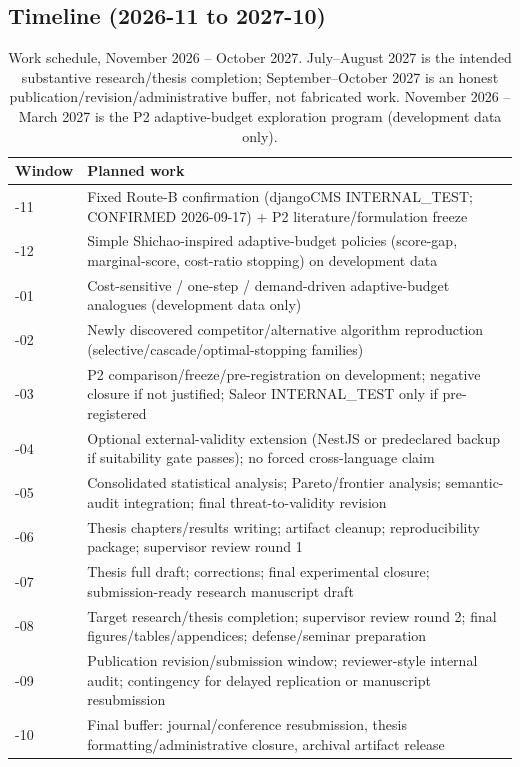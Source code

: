 \documentclass[11pt,a4paper]{article}
\begin{document}
\subsection{Timeline (2026-11 to 2027-10)}
\begin{table}[h]
\centering
\small
\renewcommand{\arraystretch}{1.25}
\setlength{\tabcolsep}{6pt}
\begin{tabularx}{\textwidth}{@{}>{\raggedright\arraybackslash}p{1.9cm}>{\raggedright\arraybackslash}X@{}}
\toprule
\textbf{Window} & \textbf{Planned work} \\
\midrule
2026-11 & Fixed Route-B confirmation (djangoCMS INTERNAL\_TEST; CONFIRMED 2026-09-17) + P2 literature/formulation freeze \\
2026-12 & Simple Shichao-inspired adaptive-budget policies (score-gap, marginal-score, cost-ratio stopping) on development data \\
2027-01 & Cost-sensitive / one-step / demand-driven adaptive-budget analogues (development data only) \\
2027-02 & Newly discovered competitor/alternative algorithm reproduction (selective/cascade/optimal-stopping families) \\
2027-03 & P2 comparison/freeze/pre-registration on development; negative closure if not justified; Saleor INTERNAL\_TEST only if pre-registered \\
2027-04 & Optional external-validity extension (NestJS or predeclared backup if suitability gate passes); no forced cross-language claim \\
2027-05 & Consolidated statistical analysis; Pareto/frontier analysis; semantic-audit integration; final threat-to-validity revision \\
2027-06 & Thesis chapters/results writing; artifact cleanup; reproducibility package; supervisor review round 1 \\
2027-07 & Thesis full draft; corrections; final experimental closure; submission-ready research manuscript draft \\
2027-08 & Target research/thesis completion; supervisor review round 2; final figures/tables/appendices; defense/seminar preparation \\
2027-09 & Publication revision/submission window; reviewer-style internal audit; contingency for delayed replication or manuscript resubmission \\
2027-10 & Final buffer: journal/conference resubmission, thesis formatting/administrative closure, archival artifact release \\
\bottomrule
\end{tabularx}
\caption{Work schedule, November 2026 -- October 2027. July--August 2027 is the intended substantive research/thesis completion; September--October 2027 is an honest publication/revision/administrative buffer, not fabricated work. November 2026 -- March 2027 is the P2 adaptive-budget exploration program (development data only).}
\end{table}
\end{document}
